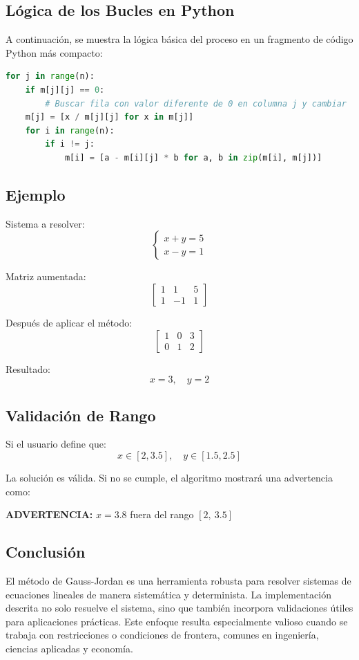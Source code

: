 \documentclass[a4paper,10pt]{article}
\begin{document}
\subsection{Lógica de los Bucles en Python}
A continuación, se muestra la lógica básica del proceso en un fragmento de código Python más compacto:

\begin{lstlisting}[language=Python, caption={Lógica simplificada de los bucles}]
for j in range(n):
    if m[j][j] == 0:
        # Buscar fila con valor diferente de 0 en columna j y cambiar
    m[j] = [x / m[j][j] for x in m[j]]
    for i in range(n):
        if i != j:
            m[i] = [a - m[i][j] * b for a, b in zip(m[i], m[j])]
\end{lstlisting}

\subsection{Ejemplo}

Sistema a resolver:
\[
\begin{cases}
x + y = 5 \\
x - y = 1
\end{cases}
\]

Matriz aumentada:
\[
\left[
\begin{array}{cc|c}
1 & 1 & 5 \\
1 & -1 & 1
\end{array}
\right]
\]

Después de aplicar el método:
\[
\left[
\begin{array}{cc|c}
1 & 0 & 3 \\
0 & 1 & 2
\end{array}
\right]
\]

Resultado:
\[
x = 3,\quad y = 2
\]

\subsection{Validación de Rango}

Si el usuario define que:
\[
x \in [2, 3.5], \quad y \in [1.5, 2.5]
\]

La solución es válida. Si no se cumple, el algoritmo mostrará una advertencia como:

\textbf{ADVERTENCIA:} $x = 3.8$ fuera del rango $[2,\ 3.5]$

\subsection{Conclusión}
El método de Gauss-Jordan es una herramienta robusta para resolver sistemas de ecuaciones lineales de manera sistemática y determinista. La implementación descrita no solo resuelve el sistema, sino que también incorpora validaciones útiles para aplicaciones prácticas. Este enfoque resulta especialmente valioso cuando se trabaja con restricciones o condiciones de frontera, comunes en ingeniería, ciencias aplicadas y economía.
\end{document}
